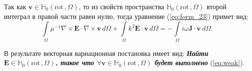 \documentclass[a4paper,12pt]{article}
\begin{document}
Так как $\mathbf{v} \in \mathbb{H}_{0}( \mathrm{rot}\,, \Omega )$, то из свойств пространства $\mathbb{H}_{0}( \mathrm{rot}\,, \Omega )$ второй интеграл в правой части равен нулю, тогда уравнение (\ref{eq:form_23}) примет вид:
\begin{equation}
	\int\limits_\Omega \mu^{-1} \nabla \times \mathbf{E} \cdot \nabla \times \overline{\mathbf{v}} \,d\Omega + \int\limits_\Omega k^{2} \mathbf{E} \cdot \overline{\mathbf{v}} \,d\Omega = - \int\limits_\Omega i \omega \mathbf{J} \cdot \overline{\mathbf{v}} \,d\Omega . \label{eq:weak}
\end{equation}

В результате векторная вариационная постановка имеет вид: \textbf{\textit{Найти $\mathbf{E} \in \mathbb{H}_{0}( \mathrm{rot}\,, \Omega )$, такое что $\forall \mathbf{v} \in \mathbb{H}_{0}( \mathrm{rot}\,, \Omega )$ будет выполнено}} (\ref{eq:weak}).
\end{document}
